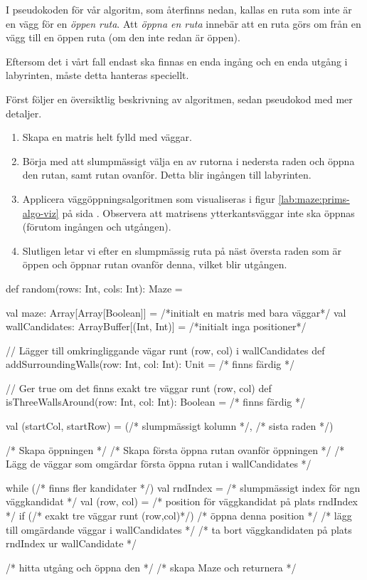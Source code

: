 I pseudokoden för vår algoritm, som återfinns nedan, kallas en ruta som inte är en vägg för en \emph{öppen ruta}. Att \emph{öppna en ruta} innebär att en ruta görs om från en vägg till en öppen ruta (om den inte redan är öppen).

Eftersom det i vårt fall endast ska finnas en enda ingång och en enda utgång i labyrinten, måste detta hanteras speciellt.

Först följer en översiktlig beskrivning av algoritmen, sedan pseudokod med mer detaljer.

\begin{enumerate}[noitemsep]
    \item Skapa en matris helt fylld med väggar.
	\item Börja med att slumpmässigt välja en av rutorna i nedersta raden och öppna den rutan, samt rutan ovanför. Detta blir ingången till labyrinten.
	\item Applicera väggöppningsalgoritmen som visualiseras i figur \ref{lab:maze:prims-algo-viz} på sida \pageref{lab:maze:prims-algo-viz}. Observera att matrisens ytterkantsväggar inte ska öppnas (förutom ingången och utgången).
	\item Slutligen letar vi efter en slumpmässig ruta på näst översta raden som är öppen och öppnar rutan ovanför denna, vilket blir utgången.
\end{enumerate}

\begin{CodeSmall}
  def random(rows: Int, cols: Int): Maze = {
    val maze: Array[Array[Boolean]] = /*initialt en matris med bara väggar*/
    val wallCandidates: ArrayBuffer[(Int, Int)] = /*initialt inga positioner*/

    // Lägger till omkringliggande vägar runt (row, col) i wallCandidates
    def addSurroundingWalls(row: Int, col: Int): Unit = /* finns färdig */

    // Ger true om det finns exakt tre väggar runt (row, col)
    def isThreeWallsAround(row: Int, col: Int): Boolean = /* finns färdig */

    val (startCol, startRow) = (/* slumpmässigt kolumn */, /* sista raden */)

    /* Skapa öppningen */
    /* Skapa första öppna rutan ovanför öppningen */
    /* Lägg de väggar som omgärdar första öppna rutan i wallCandidates */

    while (/* finns fler kandidater */) {
      val rndIndex = /* slumpmässigt index för ngn väggkandidat */
      val (row, col) = /* position för väggkandidat på plats rndIndex */
      if (/* exakt tre väggar runt (row,col)*/) {
        /* öppna denna position */
        /* lägg till omgärdande väggar i wallCandidates */
      }
      /* ta bort väggkandidaten på plats rndIndex ur wallCandidate */
    }

    /* hitta utgång och öppna den */
    /* skapa Maze och returnera */
  }
\end{CodeSmall}


